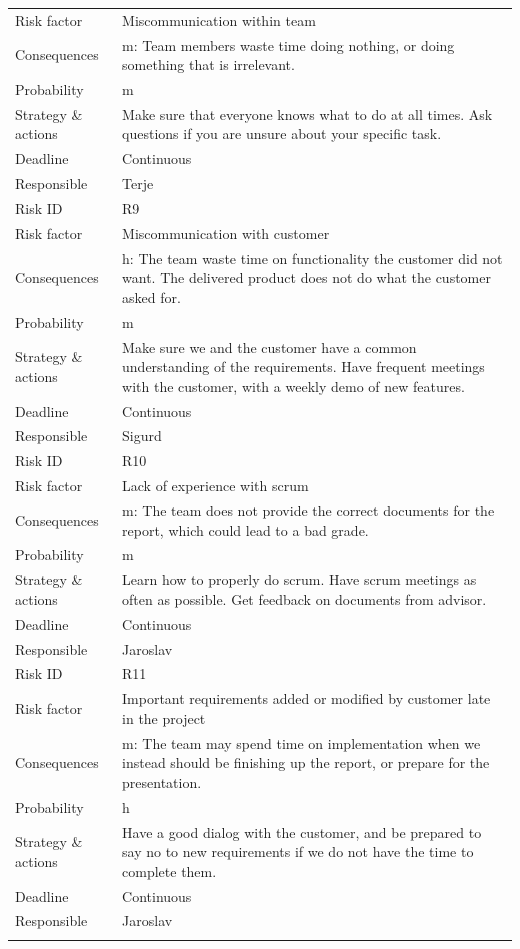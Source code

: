 \begin{longtable}{>{\footnotesize}p{} >{\footnotesize}p{}}
	Risk factor & Miscommunication within team \\
	Consequences & \Gls{m}: Team members waste time doing nothing, or doing something that is irrelevant. \\
	Probability & \Gls{m} \\ 
	Strategy \& actions & Make sure that everyone knows what to do at all times. Ask questions if you are unsure about your specific task. \\
	Deadline & Continuous \\
	Responsible & Terje \\
	\midrule
	Risk ID & R9 \\
	Risk factor & Miscommunication with customer \\
	Consequences & \Gls{h}: The team waste time on functionality the customer did not want. The delivered product does not do what the customer asked for. \\
	Probability & \Gls{m} \\ 
	Strategy \& actions & Make sure we and the customer have a common understanding of the requirements. Have frequent meetings with the customer, with a weekly demo of new features.  \\
	Deadline & Continuous \\
	Responsible & Sigurd \\
	\midrule
	Risk ID & R10 \\
	Risk factor & Lack of experience with \Gls{scrum} \\
	Consequences & \Gls{m}: The team does not provide the correct documents for the report, which could lead to a bad grade. \\
	Probability & \Gls{m} \\ 
	Strategy \& actions & Learn how to properly do \Gls{scrum}. Have \Gls{scrum} meetings as often as possible. Get feedback on documents from advisor. \\
	Deadline & Continuous \\
	Responsible & Jaroslav \\
	\midrule
	Risk ID & R11 \\
	Risk factor & Important requirements added or modified by customer late in the project \\
	Consequences & \Gls{m}: The team may spend time on implementation when we instead should be finishing up the report, or prepare for the presentation. \\
	Probability & \Gls{h} \\ 
	Strategy \& actions &  Have a good dialog with the customer, and be prepared to say no to new requirements if we do not have the time to complete them.\\
	Deadline & Continuous \\
	Responsible & Jaroslav \\
	\bottomrule
	\label{tab:risk}
\end{longtable}
